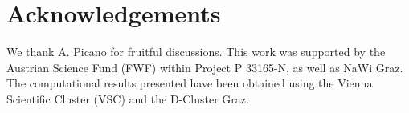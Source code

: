 \documentclass[aps,prb,groupedaddress,showpacs,twocolumn,superscriptaddress,10pt]{revtex4-2}
\begin{document}
\section*{Acknowledgements}

We thank A. Picano for fruitful discussions. This work was supported by the Austrian Science Fund (FWF) within Project P 33165-N, as well as NaWi Graz. The computational results presented have been obtained using the Vienna Scientific Cluster (VSC) and the D-Cluster Graz.
 
   
   
 
 
%  
%
% 
%
\end{document}
